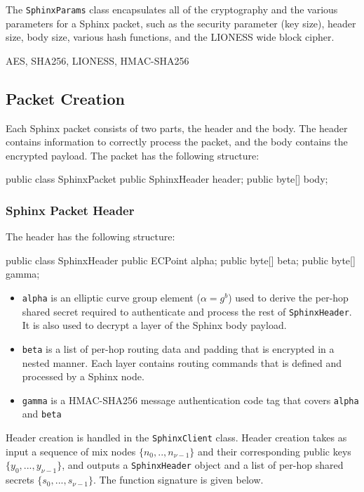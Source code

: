 \documentclass[12pt,a4paper,twoside,openright]{report}
\begin{document}
The \verb|SphinxParams| class encapsulates all of the cryptography and the various parameters for a Sphinx packet, such as the security parameter (key size), header size, body size, various hash functions, and the LIONESS wide block cipher.

AES, SHA256, LIONESS, HMAC-SHA256

\subsection{Packet Creation}

Each Sphinx packet consists of two parts, the header and the body. The header contains information to correctly process the packet, and the body contains the encrypted payload. The packet has the following structure:

\begin{javacode}
public class SphinxPacket {
	public SphinxHeader header;
	public byte[] body;
}
\end{javacode}
	
\subsubsection{Sphinx Packet Header}

The header has the following structure:

\begin{javacode}
public class SphinxHeader {
	public ECPoint alpha;
	public byte[] beta;
	public byte[] gamma;
}
\end{javacode}

\begin{itemize}
	\item \verb|alpha| is an elliptic curve group element ($\alpha = g^b$) used to derive the per-hop shared secret required to authenticate and process the rest of \verb|SphinxHeader|. It is also used to decrypt a layer of the Sphinx body payload.
	\item \verb|beta| is a list of per-hop routing data and padding that is encrypted in a nested manner. Each layer contains routing commands that is defined and processed by a Sphinx node.
	\item \verb|gamma| is a HMAC-SHA256 message authentication code tag that covers \verb|alpha| and \verb|beta|
\end{itemize}

Header creation is handled in the \verb|SphinxClient| class. Header creation takes as input a sequence of mix nodes $\{n_0,..,n_{\nu-1}\}$ and their corresponding public keys $\{y_0,...,y_{\nu-1}\}$, and outputs a \verb|SphinxHeader| object and a list of per-hop shared secrets $\{s_0,...,s_{\nu-1}\}$. The function signature is given below.
\end{document}
